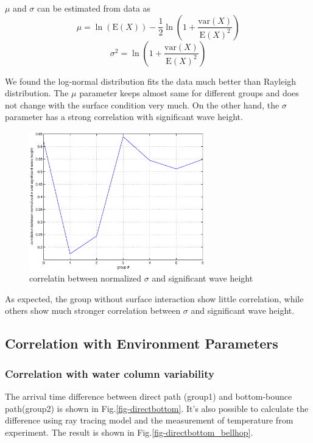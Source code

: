 $\mu$ and $\sigma$ can be estimated from data as
\begin{equation}
\mu =
\ln(\mathrm{E}(X))-\frac{1}{2}\ln\left(1+\frac{\mathrm{var}(X)}{\mathrm{E}(X)^2}\right)\end{equation}
\begin{equation}\sigma^2 =
\ln\left(1+\frac{\mathrm{var}(X)}{\mathrm{E}(X)^2}\right)\end{equation}


We found the log-normal distribution fits the data much better than
Rayleigh distribution.  The $\mu$ parameter keeps almost same for
different groups and does not change with the surface condition very
much. On the other hand, the $\sigma$ parameter has a strong
correlation with significant wave height.

\begin{figure}
\begin{center}
\includegraphics[width=3in]{correlation_sigma_waveheight.eps}
\caption{\normalsize correlatin between normalized $\sigma$ and
significant wave height }\label{fig-corr_sigma_wh}
\end{center}
\end{figure}

As expected, the group without surface interaction show little
correlation, while others show much stronger correlation between
$\sigma$ and significant wave height.
\subsection{Correlation with Environment Parameters}
\subsubsection{Correlation with water column variability}
The arrival time difference between direct path (group1) and
bottom-bounce path(group2) is shown in Fig.\ref{fig-directbottom}.
It's also possible to calculate the difference using ray tracing
model and the measurement of temperature from experiment. The result
is shown in Fig.\ref{fig-directbottom_bellhop}.
